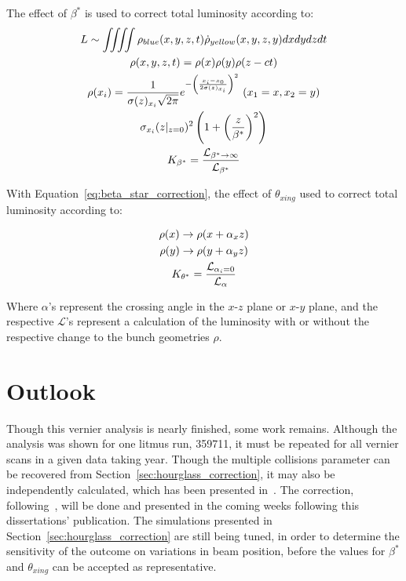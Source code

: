 {\noindent}The effect of $\beta^*$ is used to correct total luminosity according to:
\begin{gather}
  L\sim \iiiint \rho_{blue}(x,y,z,t)\dot\rho_{yellow}(x,y,z,y)dxdydzdt \\
  \rho(x,y,z,t) = \rho(x)\rho(y)\rho(z-ct) \\
  \rho(x_i) = {{1}\over{\sigma(z)_{x_i}
  \sqrt{2\pi}}}e^{-\left({{x_i-x_0}\over{2\sigma(z)_{x_i}}}\right)^2}~(x_1 = x, x_2
  = y)\\
  \sigma_{x_i}(z\vert_{z=0})^2\left(1+\left({{z}\over{\beta^*}}\right)^2\right) \\
  K_{\beta^*} =
{{\mathcal{L}_{\beta^*\rightarrow\infty}}\over{\mathcal{L}_{\beta^*}}}
\label{eq:beta_star_correction}
\end{gather}

{\noindent}With Equation~\ref{eq:beta_star_correction}, the effect of
$\theta_{xing}$ used to correct total luminosity according to: 

\begin{gather}
  \rho(x)\rightarrow\rho(x+\alpha_xz) \\
  \rho(y)\rightarrow\rho(y+\alpha_yz) \\
  K_{\theta^*} = {{\mathcal{L}_{\alpha_i = 0}}\over{\mathcal{L}_{\alpha}}}
\end{gather}

Where $\alpha$'s represent the crossing angle in the $x$-$z$ plane or $x$-$y$
plane, and the respective $\mathcal{L}$'s represent a calculation of the
luminosity with or without the respective change to the bunch geometries $\rho$.

\clearpage
\section{Outlook}
\label{sec:remaining_work}

Though this vernier analysis is nearly finished, some work remains. Although the
analysis was shown for one litmus run, 359711, it must be repeated for all
vernier scans in a given data taking year. Though the multiple collisions
parameter can be recovered from Section~\ref{sec:hourglass_correction}, it may
also be independently calculated, which has been presented in~\cite{Wolin2014}.
The correction, following~\cite{Wolin2014}, will be done and presented in the
coming weeks following this dissertations' publication. The simulations
presented in Section~\ref{sec:hourglass_correction} are still being tuned, in
order to determine the sensitivity of the outcome on variations in beam
position, before the values for $\beta^*$ and $\theta_{xing}$ can be accepted as
representative.

